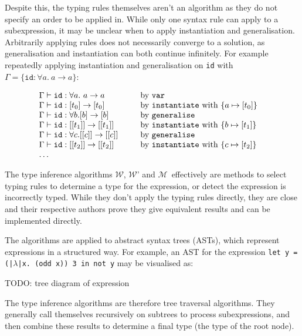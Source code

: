 \documentclass[a4paper,fleqn,oneside,12pt]{report}
\newcommand{\W}{$\mathcal{W}$}
\newcommand{\M}{$\mathcal{M}$}
\begin{document}
Despite this, the typing rules themselves aren't an algorithm as they do not specify an order to be applied in. While only one syntax rule can apply to a subexpression, it may be unclear when to apply instantiation and generalisation. Arbitrarily applying rules does not necessarily converge to a solution, as generalisation and instantiation can both continue infinitely. For example repeatedly applying instantiation and generalisation on \texttt{id} with $\Gamma = \{ \mathtt{id} : \forall a.\ a \rightarrow a \}$:

$$
\begin{array}{lclc}
  \Gamma \vdash \mathtt{id} : \forall a.\ a \rightarrow a & \hspace{0.25cm} & \textrm{by}\ \mathtt{var} & \\
  \Gamma \vdash \mathtt{id} : [t_0] \rightarrow [t_0] & & \textrm{by}\ \mathtt{instantiate}\ \textrm{with}\ \{ a \mapsto [t_0] \}& \\
  \Gamma \vdash \mathtt{id} : \forall b. [b] \rightarrow [b] & & \textrm{by}\ \mathtt{generalise} & \\
  \Gamma \vdash \mathtt{id} : [[t_1]] \rightarrow [[t_1]] & & \textrm{by}\ \mathtt{instantiate}\ \textrm{with}\ \{ b \mapsto [t_1] \} & \\
  \Gamma \vdash \mathtt{id} : \forall c. [[c]] \rightarrow [[c]] & & \textrm{by}\ \mathtt{generalise} & \\
  \Gamma \vdash \mathtt{id} : [[t_2]] \rightarrow [[t_2]] & & \textrm{by}\ \mathtt{instantiate}\ \textrm{with}\ \{ c \mapsto [t_2] \} & \\
  \dots & & & \\
\end{array}
$$

The type inference algorithms \W, \W’ and \M\ effectively are methods to select typing rules to determine a type for the expression, or detect the expression is incorrectly typed. While they don't apply the typing rules directly, they are close and their respective authors prove they give equivalent results and can be implemented directly.

The algorithms are applied to abstract syntax trees (ASTs), which represent expressions in a structured way. For example, an AST for the expression \texttt{let y = (|$\lambda$|x. (odd x)) 3 in not y} may be visualised as:

TODO: tree diagram of expression

The type inference algorithms are therefore tree traversal algorithms. They generally call themselves recursively on subtrees to process subexpressions, and then combine these results to determine a final type (the type of the root node).
\end{document}
